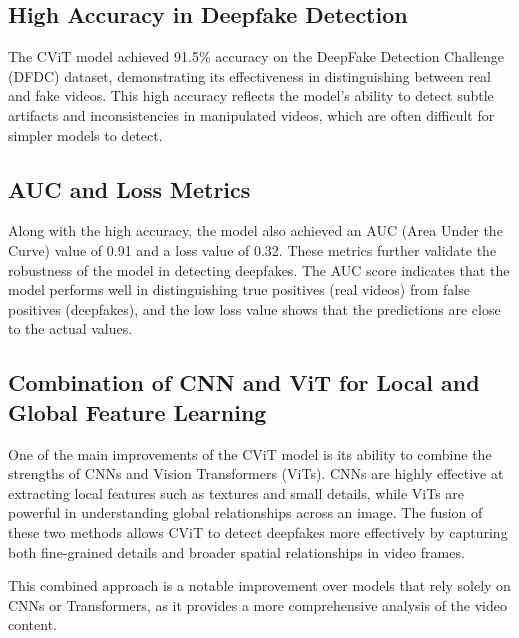 \documentclass{report}
\begin{document}
	\subsection{High Accuracy in Deepfake Detection}
	The CViT model achieved 91.5\% accuracy on the DeepFake Detection Challenge (DFDC) dataset, demonstrating its effectiveness in distinguishing between real and fake videos. This high accuracy reflects the model's ability to detect subtle artifacts and inconsistencies in manipulated videos, which are often difficult for simpler models to detect.
	
	
	\subsection{AUC and Loss Metrics}
	Along with the high accuracy, the model also achieved an AUC (Area Under the Curve) value of 0.91 and a loss value of 0.32. These metrics further validate the robustness of the model in detecting deepfakes. The AUC score indicates that the model performs well in distinguishing true positives (real videos) from false positives (deepfakes), and the low loss value shows that the predictions are close to the actual values.
	
	
	\subsection{Combination of CNN and ViT for Local and Global Feature Learning}
	One of the main improvements of the CViT model is its ability to combine the strengths of CNNs and Vision Transformers (ViTs). CNNs are highly effective at extracting local features such as textures and small details, while ViTs are powerful in understanding global relationships across an image. The fusion of these two methods allows CViT to detect deepfakes more effectively by capturing both fine-grained details and broader spatial relationships in video frames.
	
	
	This combined approach is a notable improvement over models that rely solely on CNNs or Transformers, as it provides a more comprehensive analysis of the video content.
	
	
\end{document}
